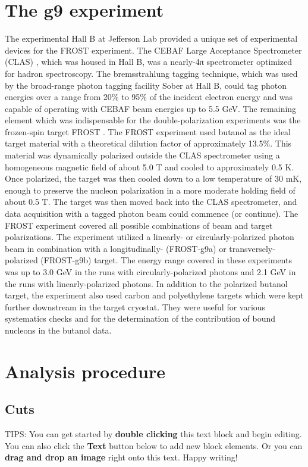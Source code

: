 \section{The g9 experiment}
The experimental Hall B at Jefferson Lab provided a unique set of experimental devices for the FROST experiment. The CEBAF Large Acceptance Spectrometer (CLAS)\cite{CLAS} , which was housed
in Hall B, was a nearly-4π spectrometer optimized for hadron spectroscopy. The bremsstrahlung tagging technique, which was used by the broad-range photon tagging facility Sober\cite{Sober_2000} at Hall B, could
tag photon energies over a range from 20\% to 95\% of the incident electron energy and was capable of operating with CEBAF beam energies up to 5.5 GeV. The remaining element which was
indispensable for the double-polarization experiments was the frozen-spin target FROST \cite{Keith_2012}. The FROST experiment used butanol as the ideal target material with a theoretical dilution factor of approximately 13.5\%. This material was dynamically polarized outside the CLAS spectrometer using a homogeneous magnetic field of about 5.0 T and cooled to approximately 0.5 K. Once polarized, the target was then cooled down to a low temperature of 30 mK, enough to preserve the nucleon polarization in a more moderate holding field of about 0.5 T. The target was then moved back into the CLAS spectrometer, and data acquisition with a tagged photon beam could commence (or
continue). The FROST experiment covered all possible combinations of beam and target polarizations. The experiment utilized a linearly- or circularly-polarized photon beam in combination with a longitudinally- (FROST-g9a) or transversely-polarized (FROST-g9b) target. The energy range covered in these experiments was up to 3.0 GeV in the runs with circularly-polarized photons and 2.1 GeV in the runs with linearly-polarized photons. In addition to the polarized butanol target, the experiment also used carbon and polyethylene targets which were kept further downstream in the target cryostat. They were useful for various systematics checks and for the determination of
the contribution of bound nucleons in the butanol data.

\section{Analysis procedure}
\subsection{Cuts}



TIPS:
You can get started by \textbf{double clicking} this text block and begin editing. You can also click the \textbf{Text} button below to add new block elements. Or you can \textbf{drag and drop an image} right onto this text. Happy writing!
